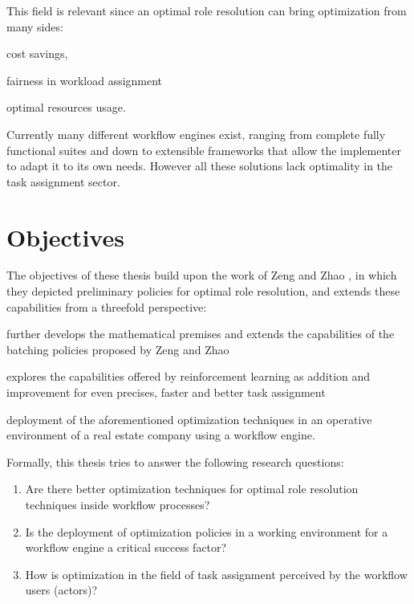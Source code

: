 \documentclass{seal_thesis}
\begin{document}
This field is relevant since an optimal role resolution can bring optimization from many sides:
\begin{enumerate*}
	\item cost savings,
	\item fairness in workload assignment
	\item optimal resources usage.
\end{enumerate*}

Currently many different workflow engines exist, ranging from complete fully functional suites and down to extensible frameworks that allow the implementer to adapt it to its own needs. However all these solutions lack optimality in the task assignment sector.

\section{Objectives}
\label{sec:objectives}

The objectives of these thesis build upon the work of Zeng and Zhao \cite{Zeng2005}, in which they depicted preliminary policies for optimal role resolution, and extends these capabilities from a threefold perspective:
\begin{enumerate*}
	\item further develops the mathematical premises and extends the capabilities of the batching policies proposed by Zeng and Zhao
	\item explores the capabilities offered by reinforcement learning as addition and improvement for even precises, faster and better task assignment
	\item deployment of the aforementioned optimization techniques in an operative environment of a real estate company using a workflow engine.
\end{enumerate*}

Formally, this thesis tries to answer the following research questions:

\begin{enumerate}
	\item Are there better optimization techniques for optimal role resolution techniques inside workflow processes?
	\item Is the deployment of optimization policies in a working environment for a workflow engine a critical success factor?
	\item How is optimization in the field of task assignment perceived by the workflow users (actors)?
\end{enumerate}
\end{document}
